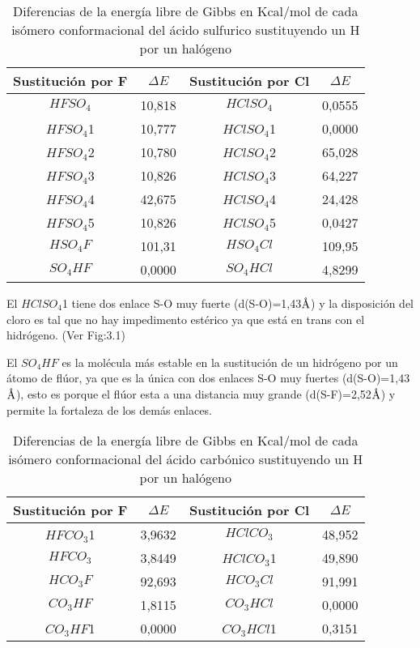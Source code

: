 \begin{table}[H]
\begin{center}
\begin{tabular}{|c|c|c|c|}
\hline
Sustitución por F & $\Delta E$ & Sustitución por Cl & $\Delta E$ \\ \hline
$HFSO_4$	& 10,818 & $HClSO_4$ & 0,0555 \\ \hline
$HFSO_4$1 & 10,777 & $HClSO_4$1 & 0,0000 \\ \hline
$HFSO_4$2 & 10,780 & $HClSO_4$2 & 65,028 \\ \hline
$HFSO_4$3 & 10,826 & $HClSO_4$3 & 64,227 \\ \hline
$HFSO_4$4 & 42,675 & $HClSO_4$4 & 24,428 \\ \hline
$HFSO_4$5 & 10,826 & $HClSO_4$5 & 0,0427 \\ \hline
$HSO_4F$ &	101,31 & $HSO_4Cl$ & 109,95 \\ \hline
$SO_4HF$ &	0,0000 & $SO_4HCl$ & 4,8299 \\ \hline
\end{tabular}
\caption{Diferencias de la energía libre de Gibbs en Kcal/mol de cada isómero conformacional del ácido sulfurico sustituyendo un H por un halógeno}
\end{center}
\end{table}
El $HClSO_4$1 tiene dos enlace S-O muy fuerte (d(S-O)=1,43$\mbox{\normalfont\AA}$) y la disposición del cloro es tal que no hay impedimento estérico ya que está en trans con el hidrógeno. (Ver Fig:3.1)

El $SO_4HF$ es la molécula más estable en la sustitución de un hidrógeno por un átomo de flúor, ya que es la única con dos enlaces S-O muy fuertes (d(S-O)=1,43 $\mbox{\normalfont\AA}$), esto es porque el flúor esta a una distancia muy grande (d(S-F)=2,52$\mbox{\normalfont\AA}$) y permite la fortaleza de los demás enlaces.

\begin{table}[H]
\begin{center}
\begin{tabular}{|c|c|c|c|}
\hline
Sustitución por F & $\Delta E$ & Sustitución por Cl & $\Delta E$ \\ \hline
$HFCO_3$1 & 3,9632 & $HClCO_3$ & 48,952 \\ \hline
$HFCO_3$ & 3,8449 & $HClCO_3$1 & 49,890 \\ \hline
$HCO_3F$ & 92,693 & $HCO_3Cl$ & 91,991 \\ \hline
$CO_3HF$ & 1,8115 & $CO_3HCl$ & 0,0000 \\ \hline
$CO_3HF$1 & 0,0000 & $CO_3HCl$1 & 0,3151 \\ \hline
\end{tabular}
\caption{Diferencias de la energía libre de Gibbs en Kcal/mol de cada isómero conformacional del ácido carbónico sustituyendo un H por un halógeno}
\end{center}
\end{table}

